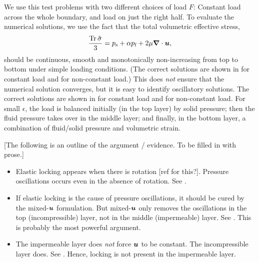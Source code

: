 
We use this test problems with two different choices of load $F$: Constant load
across the whole boundary, and load on just the right half.
To evaluate the numerical solutions, we use the fact that the total volumetric
effective stress,
\begin{equation}
\frac{\trace{\tilde{\sigma}}}{3} = \Ps + \alpha \Pf + 2\mu \nabla\cdot\U,
\end{equation}
should be continuous, smooth and monotonically non-increasing from top to bottom
under simple loading conditions. (The correct solutions are shown in
 for constant load and  for
non-constant load.)
This does \emph{not} ensure that the numerical solution converges, but it is easy to
identify oscillatory solutions.
The correct solutions are shown in
 for constant load and  for
non-constant load.
For small $\epsilon$, the load is balanced initially (in the top layer) by
solid pressure; then the fluid pressure takes over in the middle layer; and
finally, in the bottom layer, a combination of fluid/solid pressure and
volumetric strain.


[The following is an outline of the argument / evidence. To be filled in with prose.]
\begin{itemize}
\item Elastic locking appears when there is rotation [ref for this?]. Pressure oscillations
  occurs even in the absence of rotation. See
  .
\item If elastic locking is the cause of pressure oscillations, it should be
  cured by the mixed-$\boldsymbol{u}$ formulation. But mixed-$\boldsymbol{u}$ only removes the
  oscillations in the top (incompressible) layer, not in the middle
  (impermeable) layer. See . This is
  probably the most powerful argument.
\item The impermeable layer does \emph{not} force $\boldsymbol{u}$ to be constant. The
  incompressible layer does. See . Hence, locking is not
  present in the impermeable layer.
\end{itemize}

